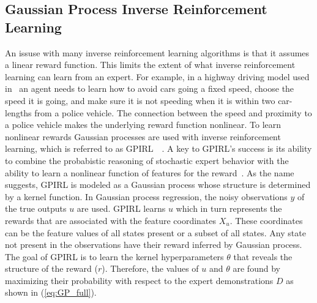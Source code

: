 \documentclass[12pt,american]{report}
\begin{document}
\subsection{Gaussian Process Inverse Reinforcement Learning}
\label{sec:gpirl}
An issuse with many inverse reinforcement learning algorithms is that it assumes a linear reward function.  This limits the extent of what inverse reinforcement learning can learn from an expert.  For example, in a highway driving model used in~\cite{levine2011nonlinear} an agent needs to learn how to avoid cars going a fixed speed, choose the speed it is going, and make sure it is not speeding when it is within two car-lengths from a police vehicle.  The connection between the speed and proximity to a police vehicle makes the underlying reward function nonlinear. To learn nonlinear rewards Gaussian processes are used with inverse reinforcement learning, which is referred to as GPIRL~\cite{qiao2011inverse}~\cite{levine2011nonlinear}. A key to GPIRL's success is its ability to combine the probabistic reasoning of stochastic expert behavior with the ability to learn a nonlinear function of features for the reward~\cite{levine2011nonlinear}. As the name suggests, GPIRL is modeled as a Gaussian process whose structure is determined by a kernel function. In Gaussian process regression, the noisy observations $y$ of the true outputs $u$ are used.  GPIRL learns $u$ which in turn represents the rewards that are associated with the feature coordinates $X_u$. These coordinates can be the feature values of all states present or a subset of all states. Any state not present in the observations have their reward inferred by Gaussian process.  The goal of GPIRL is to learn the kernel hyperparameters $\theta$ that reveals the structure of the reward ($r$). Therefore, the values of $u$ and $\theta$ are found by maximizing their probability with respect to the expert demonstrations $D$ as shown in (\ref{eq:GP_full}).
\end{document}
